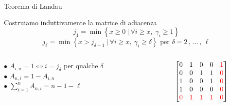 \documentclass{beamer}
\begin{document}
\begin{frame}{Teorema di Landau}
	\begin{block}{Costruiamo induttivamente la matrice di adiacenza}
		$$ j_1 = \min \left\{x \geq 0 \: \big| \: \forall i \geq x,  \; \gamma_i \geq 1 \right\} $$
		$$ j_\delta = \min\left\{x > j_{\delta-1} \: \big| \: \forall i \geq x,  \ \gamma_i \geq \delta \right\} \text{ per } \delta = 2\, , \, \dots \,, \, \ell $$
		\vspace{3mm}
	\end{block}
	\vspace{2mm}
	\pause
	\begin{columns}
		\hspace{8mm} \vspace{5mm}\begin{column}{0.6 \textwidth}
			$\bullet$ $ A_{i, n} = 1 \iff i = j_\delta $ per qualche $\delta$ \\
			\vspace{4mm}
			$\bullet$ $ A_{n, i} = 1 - A_{i, n} $ \\
			\vspace{4mm}
			$\bullet$ $ \sum_{i = 1}^n A_{n, i} = n - 1 - \ell $ \\
			\vspace{4mm}
		\end{column}
		\begin{column}{0.4 \textwidth}
			\[
			\begin{bmatrix}
				0 & 1 & 0 & 0 & \color{red}1 \\
				0 & 0 & 1 & 1 & \color{red}0 \\
				1 & 0 & 0 & 1 & \color{red}0 \\
				1 & 0 & 0 & 0 & \color{red}0 \\
				\color{red}0 & \color{red}1 & \color{red}1 & \color{red}1 & \color{red}0 \\

		    \end{bmatrix}
			\]
		\end{column}
	\end{columns}
\end{frame}
\end{document}
